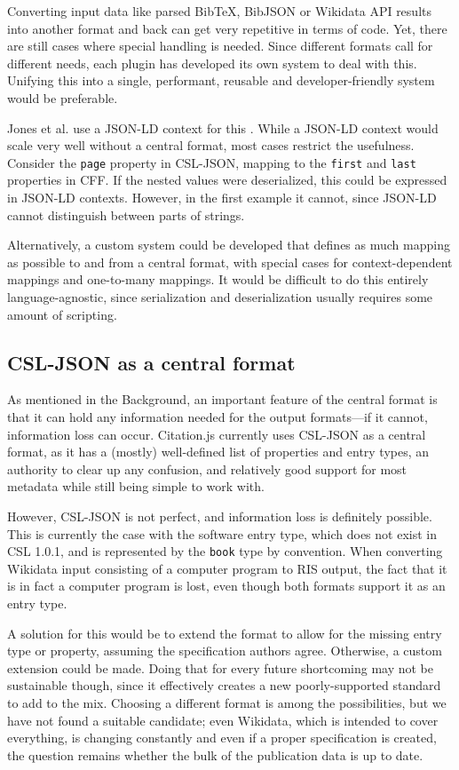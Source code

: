 \documentclass[fleqn,10pt,lineno]{wlpeerj} %
\begin{document}
Converting input data like parsed BibTeX, BibJSON or Wikidata API results into another format and back can get very repetitive in terms of code. Yet, there are still cases where special handling is needed. Since different formats call for different needs, each plugin has developed its own system to deal with this. Unifying this into a single, performant, reusable and developer-friendly system would be preferable.

Jones et al. use a JSON-LD context for this \cite{jones_codemeta:_2017}. While a JSON-LD context would scale very well without a central format, most cases restrict the usefulness. Consider the \texttt{page} property in CSL-JSON, mapping to the \texttt{first} and \texttt{last} properties in CFF. If the nested values were deserialized, this could be expressed in JSON-LD contexts. However, in the first example it cannot, since JSON-LD cannot distinguish between parts of strings.

Alternatively, a custom system could be developed that defines as much mapping as possible to and from a central format, with special cases for context-dependent mappings and one-to-many mappings. It would be difficult to do this entirely language-agnostic, since serialization and deserialization usually requires some amount of scripting.

\subsection*{CSL-JSON as a central format}

As mentioned in the Background, an important feature of the central format is that it can hold any information needed for the output formats---if it cannot, information loss can occur. Citation.js currently uses CSL-JSON as a central format, as it has a (mostly) well-defined list of properties and entry types, an authority to clear up any confusion, and relatively good support for most metadata while still being simple to work with.

However, CSL-JSON is not perfect, and information loss is definitely possible. This is currently the case with the software entry type, which does not exist in CSL 1.0.1, and is represented by the \texttt{book} type by convention. When converting Wikidata input consisting of a computer program to RIS output, the fact that it is in fact a computer program is lost, even though both formats support it as an entry type.

A solution for this would be to extend the format to allow for the missing entry type or property, assuming the specification authors agree. Otherwise, a custom extension could be made. Doing that for every future shortcoming may not be sustainable though, since it effectively creates a new poorly-supported standard to add to the mix. Choosing a different format is among the possibilities, but we have not found a suitable candidate; even Wikidata, which is intended to cover everything, is changing constantly and even if a proper specification is created, the question remains whether the bulk of the publication data is up to date.
\end{document}
